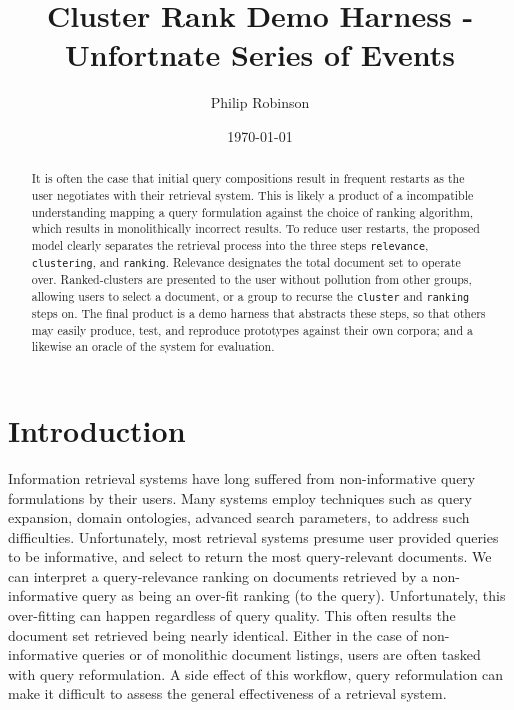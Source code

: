 \documentclass[11pt]{article}
\title{Cluster Rank Demo Harness - Unfortnate Series of Events}
\date{\today}
\author{Philip Robinson}
\affil{Oregon Health \& Science University}
\begin{document}
\maketitle
{}
\begin{abstract}
  It is often the case that initial query compositions result in frequent restarts as
  the user negotiates with their retrieval system. This is likely a product of a
  incompatible understanding mapping a query formulation against the choice of ranking
  algorithm, which results in monolithically incorrect results.
  To reduce user restarts, the proposed model clearly separates the retrieval
  process into the three steps \texttt{relevance}, \texttt{clustering}, and
  \texttt{ranking}. Relevance designates the total document set to operate over.
  Ranked-clusters are presented to the user without pollution from other groups,
  allowing users to select a document, or a group to recurse the \texttt{cluster}
  and \texttt{ranking} steps on. The final product is a demo harness that abstracts
  these steps, so that others may easily produce, test, and reproduce prototypes
  against their own corpora; and a likewise an oracle of the system for evaluation.
\end{abstract}

\section{Introduction}
Information retrieval systems have long suffered from non-informative query formulations
by their users. Many systems employ techniques such as query expansion, domain ontologies,
advanced search parameters, to address such difficulties. Unfortunately, most retrieval
systems presume user provided queries to be informative, and select to return the most
query-relevant documents. We can interpret a query-relevance ranking on documents retrieved
by a non-informative query as being an over-fit ranking (to the query). Unfortunately, this
over-fitting can happen regardless of query quality. This often results the document set
retrieved being nearly identical. Either in the case of non-informative queries or of
monolithic document listings, users are often tasked with query reformulation. A side
effect of this workflow, query reformulation can make it difficult to assess the general
effectiveness of a retrieval system\cite{Huang2009}.
\end{document}
